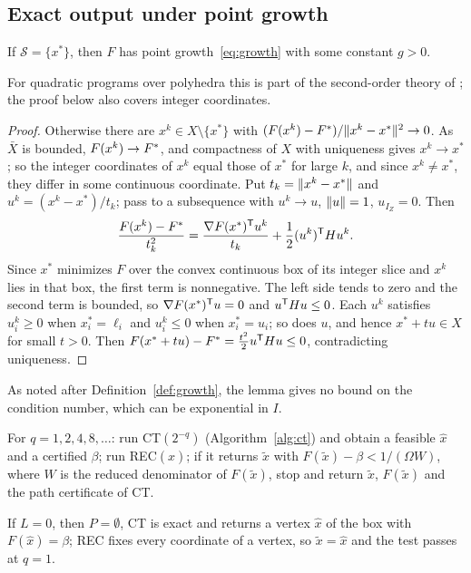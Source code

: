 \subsection{Exact output under point growth}\label{sec:exact-growth}

\begin{lemma}\label{lem:unique-growth}
If $\mathcal S=\{x^*\}$, then $F$ has point growth~\eqref{eq:growth} with
some constant $g>0$.
\end{lemma}

For quadratic programs over polyhedra this is part of the second-order theory
of \cite{Contesse1980}; the proof below also covers integer coordinates.

\begin{proof}
Otherwise there are $x^k\in X\setminus\{x^*\}$ with
$(F(x^k)-F^{*})/\lVert x^k-x^*\rVert^2\to0$. As $\bar X$ is bounded,
$F(x^k)\to F^{*}$, and compactness of $X$ with uniqueness gives $x^k\to x^*$;
so the integer coordinates of $x^k$ equal those of $x^*$ for large $k$, and
since $x^k\ne x^*$, they differ in some continuous coordinate. Put
$t_k=\lVert x^k-x^*\rVert$ and $u^k=(x^k-x^*)/t_k$; pass to a subsequence with
$u^k\to u$, $\lVert u\rVert=1$, $u_{I_Z}=0$. Then
\[
\frac{F(x^k)-F^{*}}{t_k^2}=\frac{\nabla F(x^*)^{\mathsf T}u^k}{t_k}
+\frac12(u^k)^{\mathsf T}Hu^k .
\]
Since $x^*$ minimizes $F$ over the convex continuous box of its integer slice
and $x^k$ lies in that box, the first term is nonnegative. The left side
tends to zero and the second term is bounded, so
$\nabla F(x^*)^{\mathsf T}u=0$ and $u^{\mathsf T}Hu\le0$. Each $u^k$ satisfies
$u^k_i\ge0$ when $x^*_i=\ell_i$ and $u^k_i\le0$ when $x^*_i=u_i$; so does
$u$, and hence $x^*+tu\in X$ for small $t>0$. Then
$F(x^*+tu)-F^{*}=\frac{t^2}2u^{\mathsf T}Hu\le0$, contradicting uniqueness.
\end{proof}

As noted after Definition~\ref{def:growth}, the lemma gives no bound on the
condition number, which can be exponential in $I$.

\begin{algorithm}\label{alg:ex}
For $q=1,2,4,8,\dots$: run CT$(2^{-q})$ (Algorithm~\ref{alg:ct}) and obtain a
feasible $\hat x$ and a certified $\beta$; run REC$(\hat x)$; if it returns
$\tilde x$ with $F(\tilde x)-\beta<1/(\Omega W)$, where $W$ is the reduced
denominator of $F(\tilde x)$, stop and return $\tilde x$, $F(\tilde x)$ and
the path certificate of CT.
\end{algorithm}

If $L=0$, then $P=\emptyset$, CT is exact and returns a vertex $\hat x$ of the
box with $F(\hat x)=\beta$; REC fixes every coordinate of a vertex, so
$\tilde x=\hat x$ and the test passes at $q=1$.

